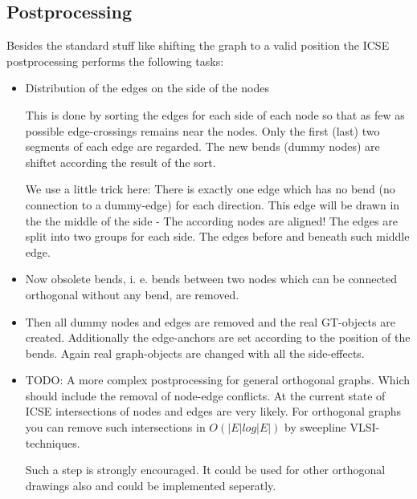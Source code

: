 \documentclass[notitlepage,fleqn]{article}
\begin{document}
\subsection{Postprocessing}

Besides the standard stuff like shifting the graph to a valid position
the ICSE postprocessing performs the following tasks:

\begin{itemize}
\item Distribution of the edges on the side of the nodes

This is done by sorting the edges for each side of each node
so that as few as possible edge-crossings remains near the nodes.
Only the first (last) two segments of each edge are regarded.
The new bends (dummy nodes) are shiftet according the result
of the sort. 

We use a little trick here:
There is exactly one edge which has no bend (no connection to
a dummy-edge) for each direction.
This edge will be drawn in the the middle of the side - The
according nodes are aligned! The edges are split into two groups
for each side. The edges before and beneath such middle edge.

\item Now obsolete bends, i. e. bends between two nodes which
  can be connected orthogonal without any bend, are removed.

\item Then all dummy nodes and edges are removed and the real
  GT-objects are created. Additionally the edge-anchors are set
  according to the position of the bends.
  Again real graph-objects are changed with all the side-effects.

\item TODO: A more complex postprocessing for general orthogonal
  graphs. Which should include the removal of node-edge conflicts.
  At the current state of ICSE intersections of nodes and edges
  are very likely. For orthogonal graphs you can remove such 
  intersections in $O(|E|log|E|)$ by sweepline VLSI-techniques.

  Such a step is strongly encouraged. It could be used for other
  orthogonal drawings also and could be implemented seperatly.
\end{itemize}
\end{document}
